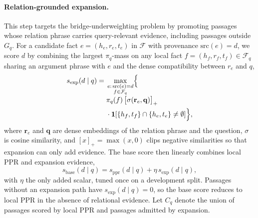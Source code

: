 \paragraph{Relation-grounded expansion.}
This step targets the bridge-underweighting problem by promoting
passages whose relation phrase carries query-relevant evidence,
including passages outside $G_q$. For a candidate fact
$e=(h_e, r_e, t_e)$ in $\mathcal{F}$ with provenance
$\mathrm{src}(e)=d$, we score $d$ by combining the largest
$\pi_q$-mass on any local fact $f=(h_f, r_f, t_f) \in \mathcal{F}_q$
sharing an argument phrase with $e$ and the dense compatibility
between $r_e$ and $q$,
\begin{equation}
\label{eq:expansion-score}
\begin{aligned}
s_{\mathrm{exp}}(d \mid q)
= {}& \max_{\substack{e:\,\mathrm{src}(e)=d \\ f \in \mathcal{F}_q}}
\Bigl\{\\[-0.3em]
&\pi_q(f)\,\bigl[\sigma(\mathbf{r}_e,\mathbf{q})\bigr]_{+}\\
&{}\cdot\mathbf{1}\!\left[
\{h_f,t_f\}\cap\{h_e,t_e\}\neq\emptyset
\right]\Bigr\},
\end{aligned}
\end{equation}
where $\mathbf{r}_e$ and $\mathbf{q}$ are dense embeddings of the
relation phrase and the question, $\sigma$ is cosine similarity, and
$[x]_{+}=\max(x,0)$ clips negative similarities so that expansion can
only add evidence. The base score then linearly combines local PPR
and expansion evidence,
\begin{equation}
\label{eq:base-score}
s_{\mathrm{base}}(d \mid q)
=
s_{\mathrm{ppr}}(d \mid q)
+
\eta\,s_{\mathrm{exp}}(d \mid q),
\end{equation}
with $\eta$ the only added scalar, tuned once on a development split.
Passages without an expansion path have
$s_{\mathrm{exp}}(d \mid q)=0$, so the base score reduces to local PPR
in the absence of relational evidence. Let $C_q$ denote the union of
passages scored by local PPR and passages admitted by expansion.

